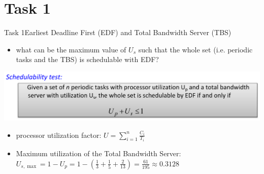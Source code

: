 
\section{Task 1}

\setcounter{task}{1}

\begin{frame}[allowframebreaks]{Task 1}{Earliest Deadline First (EDF) and Total Bandwidth Server (TBS)}
  \begin{tasknoinc}
    \begin{itemize}
      \item what can be the maximum value of $U_s$ such that the whole set (i.e. periodic tasks and the \alert{TBS}) is schedulable with \alert{EDF}?
    \end{itemize}
  \end{tasknoinc}
  \begin{requirementsnoinc}
    \includegraphics[width=\textwidth]{./figures/schedulability_test.png}
    \begin{itemize}
      \item \alert{processor utilization factor:} $U=\sum_{i=1}^n \frac{C_i}{T_i}$
    \end{itemize}
  \end{requirementsnoinc}
  \begin{solution}
    \begin{itemize}
      \item \alert{Maximum utilization of the Total Bandwidth Server:} $U_{s, \max }=1-U_p=1-(\frac{1}{3}+\frac{1}{5}+\frac{2}{13})=\frac{61}{195} \approx 0.3128$
    \end{itemize}
  \end{solution}
\end{frame}

